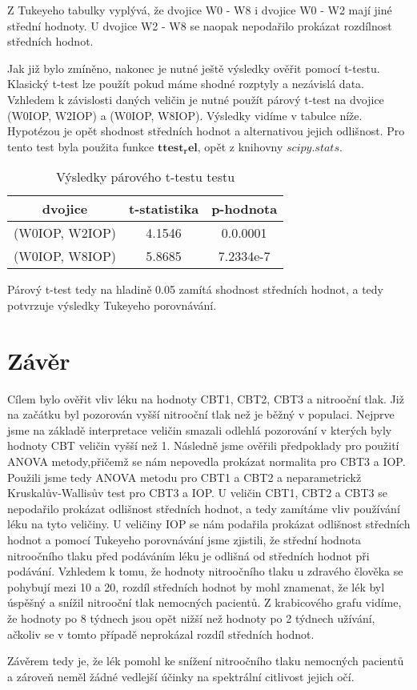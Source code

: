 \documentclass{article}
\begin{document}
Z Tukeyeho tabulky vyplývá, že dvojice W0 - W8 i dvojice W0 - W2 mají jiné střední hodnoty.
U dvojice W2 - W8 se naopak nepodařilo prokázat rozdílnost středních hodnot.

Jak již bylo zmíněno, nakonec je nutné ještě výsledky ověřit pomocí t-testu.
Klasický t-test lze použít pokud máme shodné rozptyly a nezávislá data.
Vzhledem k závislosti daných veličin je nutné použít párový t-test na  dvojice (W0IOP, W2IOP) a (W0IOP, W8IOP).
Výsledky vidíme v tabulce níže.
Hypotézou je opět shodnost středních hodnot a alternativou jejich odlišnost.
Pro tento test byla použita funkce $\mathbf{ttest_rel}$, opět z knihovny $scipy.stats$.

\begin{table}[H]
  \small
  \centering
  \caption{Výsledky párového t-testu testu}
  \begin{tabular}{|ccc|}
    \hline
    dvojice & t-statistika & p-hodnota\\
    \hline
    (W0IOP, W2IOP) & 4.1546 & 0.0.0001\\
    (W0IOP, W8IOP) & 5.8685 & 7.2334e-7\\
    \hline
  \end{tabular}
\end{table}

Párový t-test tedy na hladině 0.05 zamítá shodnost středních hodnot, a tedy potvrzuje výsledky Tukeyeho porovnávání.

\newpage
\section{Závěr}
Cílem bylo ověřit vliv léku na hodnoty CBT1, CBT2, CBT3 a nitrooční tlak.
Již na začátku byl pozorován vyšší nitrooční tlak než je běžný v populaci.
Nejprve jsme na základě interpretace veličin smazali odlehlá pozorování v kterých byly hodnoty CBT veličin vyšší než 1.
Následně jsme ověřili předpoklady pro použití ANOVA metody,přičemž se nám nepovedla prokázat normalita pro CBT3 a IOP.
Použili jsme tedy ANOVA metodu pro CBT1 a CBT2 a neparametrickž Kruskalův-Wallisův test pro CBT3 a IOP.
U veličin CBT1, CBT2 a CBT3 se nepodařilo prokázat odlišnost středních hodnot, a tedy zamítáme vliv používání léku na tyto veličiny.
U veličiny IOP se nám podařila prokázat odlišnost středních hodnot a pomocí Tukeyeho porovnávání jsme zjistili, že střední hodnota nitroočního tlaku před podáváním léku
je odlišná od středních hodnot při podávání.
Vzhledem k tomu, že hodnoty nitroočního tlaku u zdravého člověka se pohybují mezi 10 a 20, rozdíl středních hodnot by mohl znamenat, že lék byl úspěšný a snížil nitrooční tlak nemocných pacientů.
Z krabicového grafu vidíme, že hodnoty po 8 týdnech jsou opět nižší než hodnoty po 2 týdnech užívání, ačkoliv se v tomto případě neprokázal rozdíl středních hodnot.

Závěrem tedy je, že lék pomohl ke snížení nitroočního tlaku nemocných pacientů a zároveň neměl žádné vedlejší účinky na spektrální citlivost jejich očí.
\end{document}
